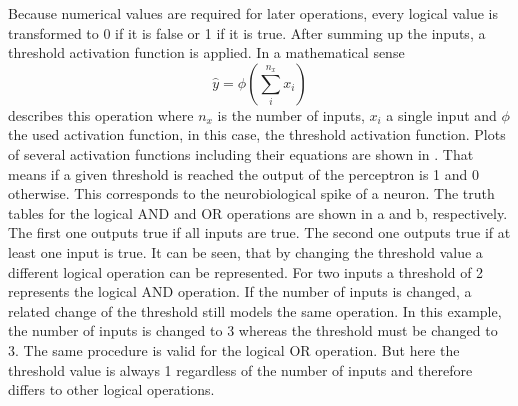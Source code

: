 Because numerical values are required for later operations, every logical value is transformed to 0 if it is false or 1 if it is true.
After summing up the inputs, a threshold activation function is applied.
In a mathematical sense
\begin{equation}
	\label{eq:neuron-mcculloch}
	\hat{y} = \phi \left( \sum_{i}^{n_x} x_i \right)
\end{equation}
describes this operation where $n_x$ is the number of inputs, $x_i$ a single input and $\phi$ the used activation function, in this case, the threshold activation function.
Plots of several activation functions including their equations are shown in .
That means if a given threshold is reached the output of the perceptron is 1 and 0 otherwise.
This corresponds to the neurobiological spike of a neuron.
The truth tables for the logical AND and OR operations are shown in a and b, respectively.
The first one outputs true if all inputs are true.
The second one outputs true if at least one input is true.
It can be seen, that by changing the threshold value a different logical operation can be represented.
For two inputs a threshold of 2 represents the logical AND operation.
If the number of inputs is changed, a related change of the threshold still models the same operation.
In this example, the number of inputs is changed to 3 whereas the threshold must be changed to 3.
The same procedure is valid for the logical OR operation.
But here the threshold value is always 1 regardless of the number of inputs and therefore differs to other logical operations.
